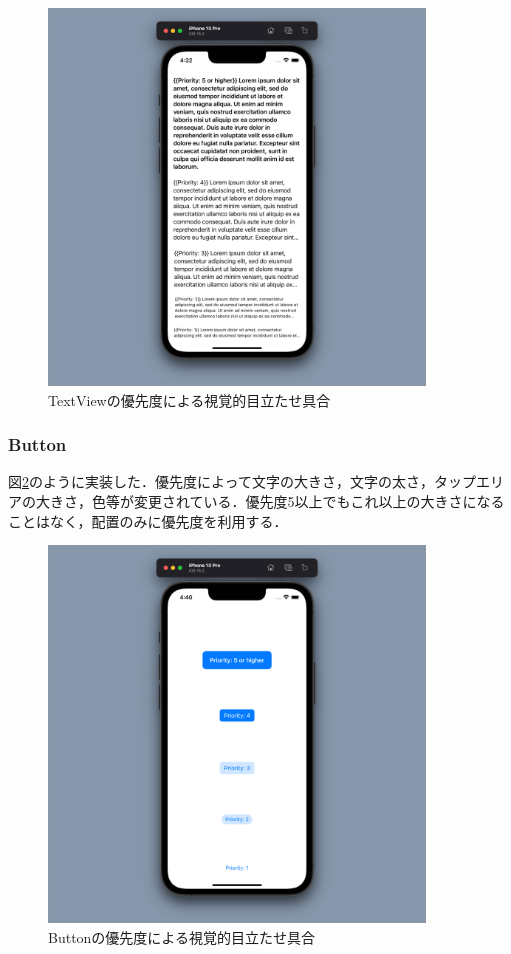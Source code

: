 \begin{figure}[htbp]
  \begin{minipage}{\hsize}
    \begin{center}
       \includegraphics[width=100mm]{img/TextView_priority.png}
    \end{center}
    \caption{TextViewの優先度による視覚的目立たせ具合}
    \label{fig:TextView_priority}
  \end{minipage}
\end{figure}

\subsubsection{Button}
図\ref{fig:button_priority}のように実装した．優先度によって文字の大きさ，文字の太さ，タップエリアの大きさ，色等が変更されている．優先度5以上でもこれ以上の大きさになることはなく，配置のみに優先度を利用する．
\begin{figure}[htbp]
  \begin{minipage}{\hsize}
    \begin{center}
       \includegraphics[width=100mm]{img/Button_priority.png}
    \end{center}
    \caption{Buttonの優先度による視覚的目立たせ具合}
    \label{fig:button_priority}
  \end{minipage}
\end{figure}

